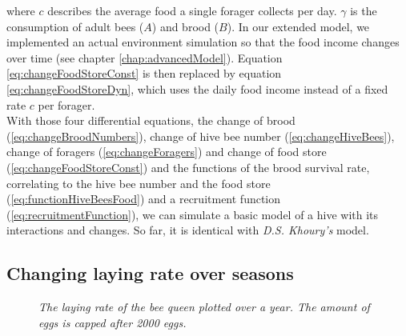 	where $c$ describes the average food a single forager collects per day. $\gamma$ is the consumption of adult bees ($A$) and brood ($B$). In our extended model, we implemented an actual environment simulation so that the food income changes over time (see chapter \ref{chap:advancedModel}). Equation \ref{eq:changeFoodStoreConst} is then replaced by equation \ref{eq:changeFoodStoreDyn}, which uses the daily food income instead of a fixed rate $c$ per forager.\\	
	With those four differential equations, the change of brood (\ref{eq:changeBroodNumbers}), change of hive bee number (\ref{eq:changeHiveBees}), change of foragers (\ref{eq:changeForagers}) and change of food store (\ref{eq:changeFoodStoreConst}) and the functions of the brood survival rate, correlating to the hive bee number and the food store (\ref{eq:functionHiveBeesFood}) and a recruitment function (\ref{eq:recruitmentFunction}), we can simulate a basic model of a hive with its interactions and changes. So far, it is identical with \textit{D.S. Khoury's} model.

	\subsection{Changing laying rate over seasons}
		\begin{figure}[H]
			\centering
			\caption{\textit{The laying rate of the bee queen plotted over a year. The amount of eggs is capped after 2000 eggs. }}
			\label{fig:dynLayingRate}
		\end{figure}
		
